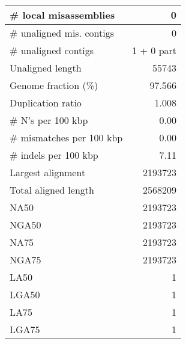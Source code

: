 \documentclass[12pt,a4paper]{article}
\begin{document}
\begin{table}[ht]
\begin{center}
\begin{tabular}{|l*{1}{|r}|}
\# local misassemblies & 0 \\ \hline
\# unaligned mis. contigs & 0 \\ \hline
\# unaligned contigs & 1 + 0 part \\ \hline
Unaligned length & 55743 \\ \hline
Genome fraction (\%) & 97.566 \\ \hline
Duplication ratio & 1.008 \\ \hline
\# N's per 100 kbp & 0.00 \\ \hline
\# mismatches per 100 kbp & 0.00 \\ \hline
\# indels per 100 kbp & 7.11 \\ \hline
Largest alignment & 2193723 \\ \hline
Total aligned length & 2568209 \\ \hline
NA50 & 2193723 \\ \hline
NGA50 & 2193723 \\ \hline
NA75 & 2193723 \\ \hline
NGA75 & 2193723 \\ \hline
LA50 & 1 \\ \hline
LGA50 & 1 \\ \hline
LA75 & 1 \\ \hline
LGA75 & 1 \\ \hline
\end{tabular}
\end{center}
\end{table}
\end{document}
